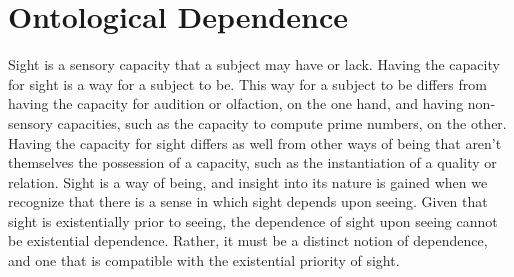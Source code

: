 \documentclass[12pt]{article}
\begin{document}

\section{Ontological Dependence} %
\label{sec:capacities_and_their_exercise_ontological_dependence}

Sight is a sensory capacity that a subject may have or lack. Having the capacity for sight is a way for a subject to be. This way for a subject to be differs from having the capacity for audition or olfaction, on the one hand, and having non-sensory capacities, such as the capacity to compute prime numbers, on the other. Having the capacity for sight differs as well from other ways of being that aren't themselves the possession of a capacity, such as the instantiation of a quality or relation. Sight is a way of being, and insight into its nature is gained when we recognize that there is a sense in which sight depends upon seeing. Given that sight is existentially prior to seeing, the dependence of sight upon seeing cannot be existential dependence. Rather, it must be a distinct notion of dependence, and one that is compatible with the existential priority of sight.
\end{document}
